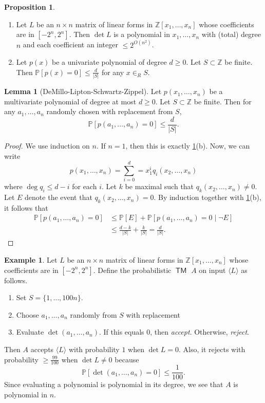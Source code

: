\documentclass[10pt,letterpaper,cm]{nupset}
\theoremstyle{definition}
\newtheorem{exmp}[definition]{Example}
\theoremstyle{theorem}
\newtheorem{lemma}[definition]{Lemma}
\newtheorem{prop}[definition]{Proposition}
\theoremstyle{remark}
\newcommand{\Z}{\mathbb Z}
\newcommand{\1}{\mathbf{1}}
\newcommand{\0}{\vec 0}
\DeclareMathOperator{\TM}{\mathsf{TM}}
\begin{document}
\begin{prop}\label{poly} $ $
\begin{enumerate}[label=(\alph*)]
\item Let $L$ be an $n\times n$ matrix of linear forms in $\Z[x_1, \ldots, x_n]$ whose coefficients are in $[{-}2^n, 2^n]$. Then $\det{L}$ is a polynomial in $x_1, \ldots, x_n$ with (total) degree $n$ and each coefficient an integer $\leq 2^{O(n^2)}$.
\item Let $p(x)$ be a univariate polynomial of degree $d \geq 0$. Let $S\subset \Z$ be finite. Then $\mathbb{P}[p(x) =0] \leq \frac{d}{|S|}$ for any $x\in_R S$.
\end{enumerate}
\end{prop}

\begin{lemma}[DeMillo-Lipton-Schwartz-Zippel]
Let $p(x_1, \ldots, x_n)$ be a multivariate polynomial of degree at most $d\geq 0$. Let $S \subset \Z$ be finite. Then for any $a_1, \ldots, a_n$ randomly chosen with replacement from $S$, $$\mathbb{P}[p(a_1, \ldots, a_n) =0] \leq \frac{d}{|S|}.$$
\end{lemma}
\begin{proof}
We use induction on $n$. If $n=1$, then this is exactly \cref{poly}(b). Now, we can write $$p(x_1, \ldots, x_n) = \sum_{i=0}^d = x_1^i q_i(x_2, \ldots, x_n)$$ where $\deg{q_i} \leq d-i$ for each $i$. Let $k$ be maximal such that $q_k(x_2, \ldots, x_n) \ne 0$. Let $E$ denote the event that $q_k(x_2, \ldots, x_n) =0$. 
By induction together with \cref{poly}(b), it follows that  
\begin{align*} \mathbb{P}[p(a_1, \ldots, a_n) =0] & \leq \mathbb{P}[E] + \mathbb{P}[p(a_1, \ldots, a_n) =0 \mid \neg{E}]
\\ & \leq \frac{d-k}{|S|} + \frac{k}{|S|} = \frac{d}{|S|}.
\end{align*}
\end{proof}

\begin{exmp}\label{matrix}
Let $L$ be an $n \times n$ matrix of linear forms in $\Z[x_1, \ldots, x_n]$ whose coefficients are in $[{-}2^n, 2^n]$. Define the probabilistic $\TM$ $A$ on input $\langle L \rangle$ as follows. 
\begin{enumerate}
\item Set $S = \{1, \ldots, 100n\}$.
\item Choose $a_1, \ldots, a_n$ randomly from $S$ with replacement
\item Evaluate $\det(a_1, \ldots, a_n)$.  If this equals $0$, then \textit{accept}. Otherwise, \textit{reject}.
\end{enumerate}
Then $A$ accepts $\langle L \rangle$ with probability $1$ when $\det{L} = 0$. Also, it rejects with probability $\geq \frac{99}{100}$ when $\det{L} \ne 0$ because $$\mathbb{P}[\det(a_1, \ldots, a_n) =0] \leq \frac{1}{100}.$$ Since evaluating a polynomial is polynomial in its degree, we see that $A$ is polynomial in $n$.
\end{exmp}
\end{document}
